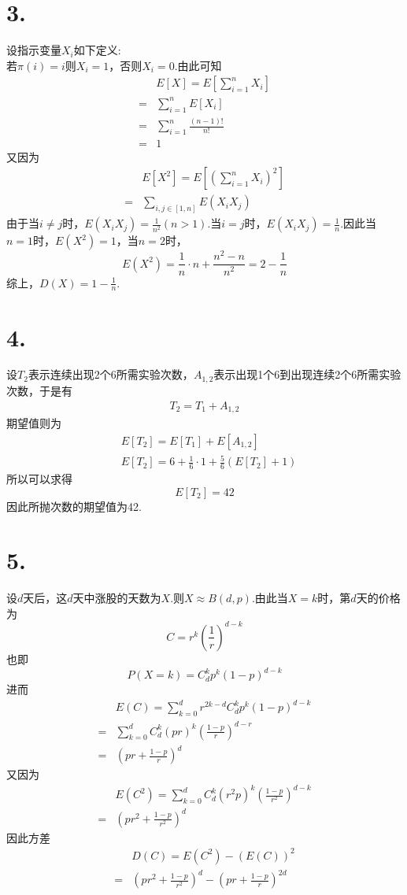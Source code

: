 \documentclass[twocolumn]{article}
\begin{document}
\begin{CJK}{UTF8}{gbsn}
			\section*{3.}
				设指示变量$X_i$如下定义:\\若$\pi(i)=i$则$X_i=1$，否则$X_i=0$.由此可知\begin{align*}
					& E[X]=E[\sum_{i=1}^{n}X_i]\\
					= & \sum_{i=1}^{n}E[X_i]\\
					= & \sum_{i=1}^{n}\frac{(n-1)!}{n!}\\
					= & 1
				\end{align*}
				又因为\begin{align*}
					& E[X^2] = E[(\sum_{i=1}^{n}X_i)^2]\\
					= & \sum_{i,j\in[1,n]}E(X_iX_j)  
				\end{align*}
				由于当$i\neq j$时，$E(X_iX_j)=\frac{1}{n^2}(n>1)$.当$i=j$时，$E(X_iX_j)=\frac{1}{n}$.因此当$n=1$时，$E(X^2)=1$，当$n=2$时，\[E(X^2)=\frac{1}{n}\cdot n+\frac{n^2-n}{n^2}=2-\frac{1}{n}\]
				综上，$D(X)=1-\frac{1}{n}$.
			\section*{4.}
				设$T_2$表示连续出现2个6所需实验次数，$A_{1,2}$表示出现1个6到出现连续2个6所需实验次数，于是有\begin{align*}
					T_2 = T_1 + A_{1,2}
				\end{align*}
				期望值则为\begin{align*}
					 & E[T_2]=E[T_1]+E[A_{1,2}]\\
					 & E[T_2]=6+\frac{1}{6}\cdot1+\frac{5}{6}(E[T_2]+1)
				\end{align*}
				所以可以求得\[E[T_2]=42\]
				因此所抛次数的期望值为42.
			\section*{5.}
				设$d$天后，这$d$天中涨股的天数为$X$.则$X\approx B(d,p)$.由此当$X=k$时，第$d$天的价格为\[C=r^k(\frac{1}{r})^{d-k}\]也即\[P(X=k)=C_d^kp^k(1-p)^{d-k}\]进而\begin{align*}
					& E(C)=\sum_{k=0}^{d}r^{2k-d}C_d^kp^k(1-p)^{d-k}\\
					= & \sum_{k=0}^{d}C_d^k(pr)^k(\frac{1-p}{r})^{d-r}\\
					= & (pr+\frac{1-p}{r})^d
				\end{align*}
				又因为\begin{align*}
					& E(C^2)=\sum_{k=0}^{d}C_d^k(r^2p)^k(\frac{1-p}{r^2})^{d-k}\\
					= & (pr^2+\frac{1-p}{r^2})^d
				\end{align*}
				因此方差\begin{align*}
					& D(C) = E(C^2)-(E(C))^2\\
					= & (pr^2+\frac{1-p}{r^2})^d-(pr+\frac{1-p}{r})^{2d}
				\end{align*}

\end{CJK}
\end{document}
